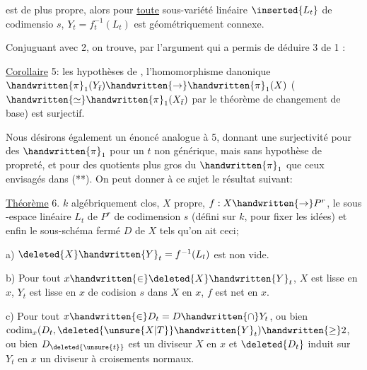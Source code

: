 est de plus propre, alors pour \uline{toute} sous-variété linéaire $\inserted{L_t}$ de codimensio $s$, $Y_t=f_t^{-1}(L_t)$ est géométriquement connexe.

Conjuguant avec 2, on trouve, par l'argument qui a permis de déduire 3 de 1 :

\uline{Corollaire} 5:  les hypothèses de ,  l'homomorphisme danonique $\handwritten{\pi}_1(Y_{\bar{t}})\handwritten{\rightarrow}\handwritten{\pi}_1(X)$ ($\handwritten{\simeq}\handwritten{\pi}_1(X_{\bar{t}})$ par le théorème de changement de base) est surjectif.

Nous désirons également un énoncé analogue à 5, donnant une surjectivité pour des $\handwritten{\pi}_1$ pour un $t$ non générique, mais sans hypothèse de propreté, et pour des quotients plus gros du $\handwritten{\pi}_1$ que ceux envisagés dans (**). On peut donner à ce sujet le résultat suivant:

\uline{Théorème} 6.  $k$ algébriquement clos,  $X$ propre, $f:X\handwritten{\rightarrow}P^r$,  le sous -espace linéaire $L_t$ de $P^r$ de codimension $s$ (défini sur $k$, pour fixer les idées)  et enfin le sous-schéma fermé $D$ de $X$ tels qu'on ait ceci; 

a)  $\deleted{X}\handwritten{Y}_t=f^{-1}(L_t)$ est non vide.

b) Pour tout $x\handwritten{\in}\deleted{X}\handwritten{Y}_t$, $X$ est lisse en $x$, $Y_t$ est lisse en $x$\handwritten{,} de codision $s$ dans $X$ en $x$, $f$ est net en $x$.

c) Pour tout $x\handwritten{\in}D_t=D\handwritten{\cap}Y_t$, o\deleted{\`{}}u  bien $\operatorname{codim}_x(D_t,\deleted{\unsure{X|T}}\handwritten{Y}_t)\handwritten{\geq}2$, ou bien $D_{\deleted{\unsure{t}}}$ est un diviseur  $X$ en $x$ et $\deleted{D_t}$ induit sur $Y_t$ en $x$ un diviseur à croisements normaux.

